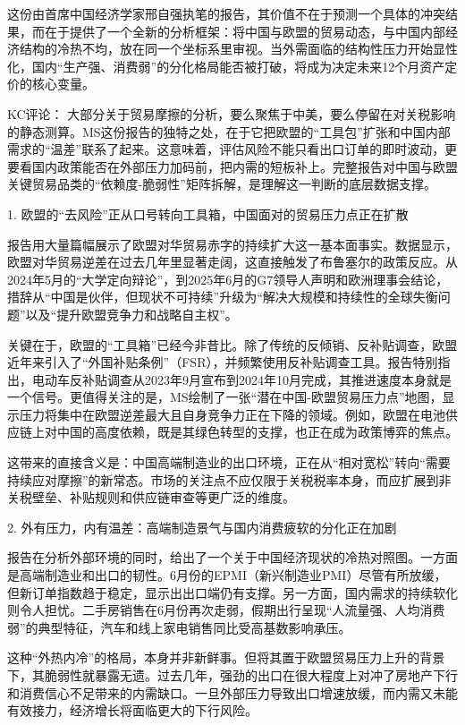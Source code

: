 \documentclass[11pt]{ctexart}
\begin{document}
这份由首席中国经济学家邢自强执笔的报告，其价值不在于预测一个具体的冲突结果，而在于提供了一个全新的分析框架：将中国与欧盟的贸易动态，与中国内部经济结构的冷热不均，放在同一个坐标系里审视。当外需面临的结构性压力开始显性化，国内“生产强、消费弱”的分化格局能否被打破，将成为决定未来12个月资产定价的核心变量。

KC评论： 大部分关于贸易摩擦的分析，要么聚焦于中美，要么停留在对关税影响的静态测算。MS这份报告的独特之处，在于它把欧盟的“工具包”扩张和中国内部需求的“温差”联系了起来。这意味着，评估风险不能只看出口订单的即时波动，更要看国内政策能否在外部压力加码前，把内需的短板补上。完整报告对中国与欧盟关键贸易品类的“依赖度-脆弱性”矩阵拆解，是理解这一判断的底层数据支撑。

1. 欧盟的“去风险”正从口号转向工具箱，中国面对的贸易压力点正在扩散

报告用大量篇幅展示了欧盟对华贸易赤字的持续扩大这一基本面事实。数据显示，欧盟对华贸易逆差在过去几年里显著走阔，这直接触发了布鲁塞尔的政策反应。从2024年5月的“大学定向辩论”，到2025年6月的G7领导人声明和欧洲理事会结论，措辞从“中国是伙伴，但现状不可持续”升级为“解决大规模和持续性的全球失衡问题”以及“提升欧盟竞争力和战略自主权”。

关键在于，欧盟的“工具箱”已经今非昔比。除了传统的反倾销、反补贴调查，欧盟近年来引入了“外国补贴条例”（FSR），并频繁使用反补贴调查工具。报告特别指出，电动车反补贴调查从2023年9月宣布到2024年10月完成，其推进速度本身就是一个信号。更值得关注的是，MS绘制了一张“潜在中国-欧盟贸易压力点”地图，显示压力将集中在欧盟逆差最大且自身竞争力正在下降的领域。例如，欧盟在电池供应链上对中国的高度依赖，既是其绿色转型的支撑，也正在成为政策博弈的焦点。

这带来的直接含义是：中国高端制造业的出口环境，正在从“相对宽松”转向“需要持续应对摩擦”的新常态。市场的关注点不应仅限于关税税率本身，而应扩展到非关税壁垒、补贴规则和供应链审查等更广泛的维度。

2. 外有压力，内有温差：高端制造景气与国内消费疲软的分化正在加剧

报告在分析外部环境的同时，给出了一个关于中国经济现状的冷热对照图。一方面是高端制造业和出口的韧性。6月份的EPMI（新兴制造业PMI）尽管有所放缓，但新订单指数趋于稳定，显示出出口端仍有支撑。另一方面，国内需求的持续软化则令人担忧。二手房销售在6月份再次走弱，假期出行呈现“人流量强、人均消费弱”的典型特征，汽车和线上家电销售同比受高基数影响承压。

这种“外热内冷”的格局，本身并非新鲜事。但将其置于欧盟贸易压力上升的背景下，其脆弱性就暴露无遗。过去几年，强劲的出口在很大程度上对冲了房地产下行和消费信心不足带来的内需缺口。一旦外部压力导致出口增速放缓，而内需又未能有效接力，经济增长将面临更大的下行风险。
\end{document}

